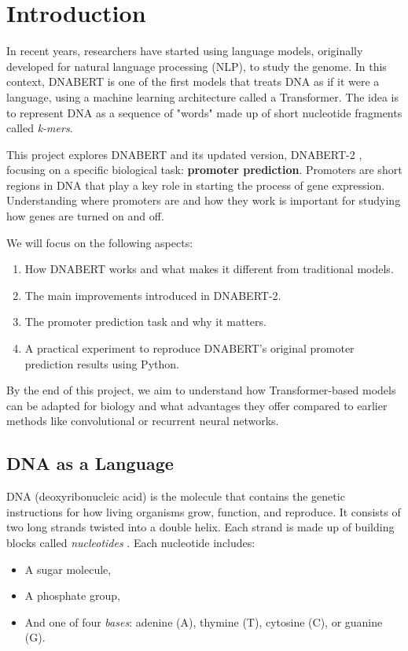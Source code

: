 \section{Introduction}

In recent years, researchers have started using language models, originally developed for natural language processing (NLP), to study the genome. In this context, DNABERT is one of the first models that treats DNA as if it were a language, using a machine learning architecture called a Transformer. The idea is to represent DNA as a sequence of "words" made up of short nucleotide fragments called \textit{k-mers}.

This project explores DNABERT \cite{10.1093/bioinformatics/btab083} and its updated version, DNABERT-2 \cite{zhou2024dnabert2efficientfoundationmodel}, focusing on a specific biological task: \textbf{promoter prediction}. Promoters are short regions in DNA that play a key role in starting the process of gene expression. Understanding where promoters are and how they work is important for studying how genes are turned on and off.

We will focus on the following aspects:
\begin{enumerate}
\item How DNABERT works and what makes it different from traditional models.
\item The main improvements introduced in DNABERT-2.
\item The promoter prediction task and why it matters.
\item A practical experiment to reproduce DNABERT's original promoter prediction results using Python.
\end{enumerate}

By the end of this project, we aim to understand how Transformer-based models can be adapted for biology and what advantages they offer compared to earlier methods like convolutional or recurrent neural networks.

\subsection{DNA as a Language }

DNA (deoxyribonucleic acid) is the molecule that contains the genetic instructions for how living organisms grow, function, and reproduce. It consists of two long strands twisted into a double helix. Each strand is made up of building blocks called \textit{nucleotides} \cite{4c869e6d-8c66-3ab2-a976-761dca85164d}. Each nucleotide includes:
\begin{itemize}
\item A sugar molecule,
\item A phosphate group,
\item And one of four \textit{bases}: adenine (A), thymine (T), cytosine (C), or guanine (G).
\end{itemize}

